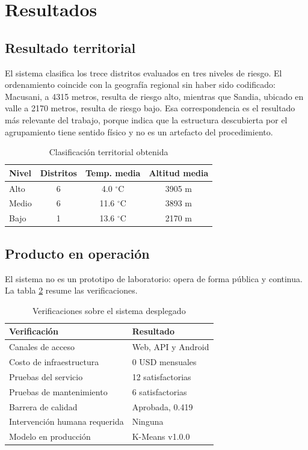 \documentclass[conference]{IEEEtran}
\begin{document}
\section{Resultados}

\subsection{Resultado territorial}

El sistema clasifica los trece distritos evaluados en tres niveles de riesgo. El
ordenamiento coincide con la geograf\'ia regional sin haber sido codificado:
Macusani, a 4315 metros, resulta de riesgo alto, mientras que Sandia, ubicado en
valle a 2170 metros, resulta de riesgo bajo. Esa correspondencia es el resultado
m\'as relevante del trabajo, porque indica que la estructura descubierta por el
agrupamiento tiene sentido f\'isico y no es un artefacto del procedimiento.

\begin{table}[htbp]
\caption{Clasificaci\'on territorial obtenida}
\begin{center}
\begin{tabular}{@{}lccc@{}}
\toprule
\textbf{Nivel} & \textbf{Distritos} & \textbf{Temp. media} & \textbf{Altitud media} \\
\midrule
Alto & 6 & 4.0 $^\circ$C & 3905 m \\
Medio & 6 & 11.6 $^\circ$C & 3893 m \\
Bajo & 1 & 13.6 $^\circ$C & 2170 m \\
\bottomrule
\end{tabular}
\label{tab:territorio}
\end{center}
\end{table}

\subsection{Producto en operaci\'on}

El sistema no es un prototipo de laboratorio: opera de forma p\'ublica y
continua. La tabla \ref{tab:resultados} resume las verificaciones.

\begin{table}[htbp]
\caption{Verificaciones sobre el sistema desplegado}
\begin{center}
\begin{tabular}{@{}ll@{}}
\toprule
\textbf{Verificaci\'on} & \textbf{Resultado} \\
\midrule
Canales de acceso & Web, API y Android \\
Costo de infraestructura & 0 USD mensuales \\
Pruebas del servicio & 12 satisfactorias \\
Pruebas de mantenimiento & 6 satisfactorias \\
Barrera de calidad & Aprobada, 0.419 \\
Intervenci\'on humana requerida & Ninguna \\
Modelo en producci\'on & K-Means v1.0.0 \\
\bottomrule
\end{tabular}
\label{tab:resultados}
\end{center}
\end{table}
\end{document}
